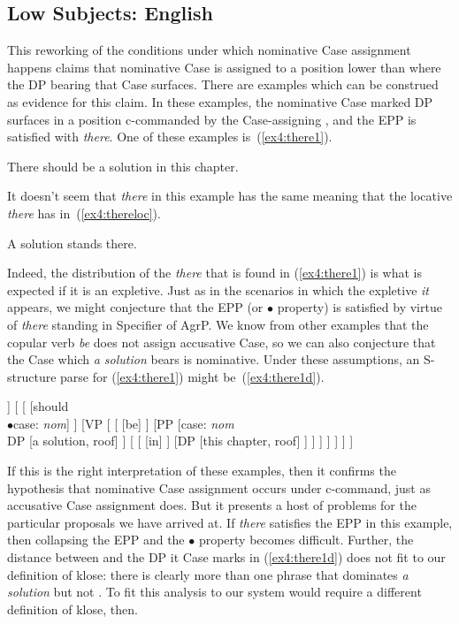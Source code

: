 \subsection{Low Subjects: English}

This reworking of the conditions under which nominative Case assignment happens claims that nominative Case is assigned to a position lower than where the DP bearing that Case surfaces. There are examples which can be construed as evidence for this claim. In these examples, the nominative Case marked DP surfaces in a position c-commanded by the Case-assigning , and the EPP is satisfied with \emph{there}. One of these examples is~(\ref{ex4:there1}).
\begin{exe}
\ex \label{ex4:there1} There should be a solution in this chapter.
\end{exe}
It doesn't seem that \emph{there} in this example has the same meaning that the locative \emph{there} has in~(\ref{ex4:thereloc}).
\begin{exe}
\ex \label{ex4:thereloc} A solution stands there.
\end{exe}
Indeed, the distribution of the \emph{there} that is found in (\ref{ex4:there1}) is what is expected if it is an expletive. Just as in the scenarios in which the expletive \emph{it} appears, we might conjecture that the EPP (or $\bullet$ property) is satisfied by virtue of \emph{there} standing in Specifier of AgrP. We know from other examples that the copular verb \emph{be} does not assign accusative Case, so we can also conjecture that the Case which \emph{a solution} bears is nominative. Under these assumptions, an S-structure parse for (\ref{ex4:there1}) might be~(\ref{ex4:there1d}).
\begin{exe}
\ex \label{ex4:there1d}
\small
\begin{forest}
[TP
	[DP [there, roof]]
	[ 
		[ [should\\ $\bullet$case: \emph{nom}] ]
		[VP [
			[ [be] ]
			[PP
				[case: \emph{nom}\\DP [a solution, roof] ]
				[
					[ [in] ]
					[DP [this chapter, roof] ]
				 ]
			 ]
		] ]
	]
]
\end{forest}
\end{exe}

If this is the right interpretation of these examples, then it confirms the hypothesis that nominative Case assignment occurs under c-command, just as accusative Case assignment does. But it presents a host of problems for the particular proposals we have arrived at. If \emph{there} satisfies the EPP in this example, then collapsing the EPP and the $\bullet$ property becomes difficult. Further, the distance between  and the DP it Case marks in (\ref{ex4:there1d}) does not fit to our definition of klose: there is clearly more than one phrase that dominates \emph{a solution} but not . To fit this analysis to our system would require a different definition of klose, then.

